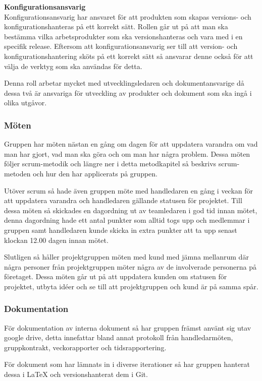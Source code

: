 \documentclass[a4paper,10pt]{article}
\begin{document}
\textbf{Konfigurationsansvarig}
\\Konfigurationsansvarig har ansvaret för att produkten som skapas versions- och konfigurationshanteras på ett korrekt sätt. Rollen går ut på att man ska bestämma vilka arbetsprodukter som ska versionshanteras och vara med i en specifik release. Eftersom att konfigurationsansvarig ser till att version- och konfigurationshantering sköts på ett korrekt sätt så ansvarar denne också för att välja de verktyg som ska användas för detta.

Denna roll arbetar mycket med utvecklingsledaren och dokumentansvarige då dessa två är ansvariga för utveckling av produkter och dokument som ska ingå i olika utgåvor.

\subsubsection{Möten}
Gruppen har möten nästan en gång om dagen för att uppdatera varandra om vad man har gjort, vad man ska göra och om man har några problem. Dessa möten följer scrum-metodik och längre ner i detta metodkapitel så beskrivs scrum-metoden och hur den har applicerats på gruppen.

Utöver scrum så hade även gruppen möte med handledaren en gång i veckan för att uppdatera varandra och handledaren gällande statusen för projektet. Till dessa möten så skickades en dagordning ut av teamledaren i god tid innan mötet, denna dagordning hade ett antal punkter som alltid togs upp och medlemmar i gruppen samt handledaren kunde skicka in extra punkter att ta upp senast klockan 12.00 dagen innan mötet.

Slutligen så håller projektgruppen möten med kund med jämna mellanrum där några personer från projektgruppen möter några av de involverade personerna på företaget. Dessa möten går ut på att uppdatera kunden om statusen för projektet, utbyta idéer och se till att projektgruppen och kund är på samma spår. 

\subsubsection{Dokumentation}
För dokumentation av interna dokument så har gruppen främst använt sig utav google drive, detta innefattar bland annat protokoll från handledarmöten, gruppkontrakt, veckorapporter och tidsrapportering.

För dokument som har lämnats in i diverse iterationer så har gruppen hanterat dessa i LaTeX och versionshanterat dem i Git.
\end{document}

